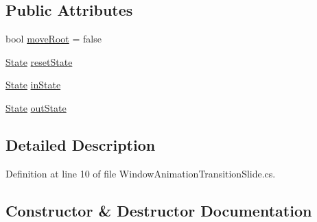 \subsection*{Public Attributes}
\begin{DoxyCompactItemize}
\item 
bool \hyperlink{class_unity_engine_1_1_u_i_1_1_windows_1_1_animations_1_1_window_animation_transition_slide_1_1_parameters_aa768b51990fcfd52680789d338516d25}{move\+Root} = false
\item 
\hyperlink{class_unity_engine_1_1_u_i_1_1_windows_1_1_animations_1_1_window_animation_transition_slide_1_1_parameters_1_1_state}{State} \hyperlink{class_unity_engine_1_1_u_i_1_1_windows_1_1_animations_1_1_window_animation_transition_slide_1_1_parameters_a13b0626d992e49dc5361c0b91b139924}{reset\+State}
\item 
\hyperlink{class_unity_engine_1_1_u_i_1_1_windows_1_1_animations_1_1_window_animation_transition_slide_1_1_parameters_1_1_state}{State} \hyperlink{class_unity_engine_1_1_u_i_1_1_windows_1_1_animations_1_1_window_animation_transition_slide_1_1_parameters_aaec34739738b0d1a01184c247c969419}{in\+State}
\item 
\hyperlink{class_unity_engine_1_1_u_i_1_1_windows_1_1_animations_1_1_window_animation_transition_slide_1_1_parameters_1_1_state}{State} \hyperlink{class_unity_engine_1_1_u_i_1_1_windows_1_1_animations_1_1_window_animation_transition_slide_1_1_parameters_a2079a5b6c1e887705032b31526726d98}{out\+State}
\end{DoxyCompactItemize}


\subsection{Detailed Description}


Definition at line 10 of file Window\+Animation\+Transition\+Slide.\+cs.



\subsection{Constructor \& Destructor Documentation}
\hypertarget{class_unity_engine_1_1_u_i_1_1_windows_1_1_animations_1_1_window_animation_transition_slide_1_1_parameters_af9485eb5cbd7ba3cc7a08988ba60f187}{}
